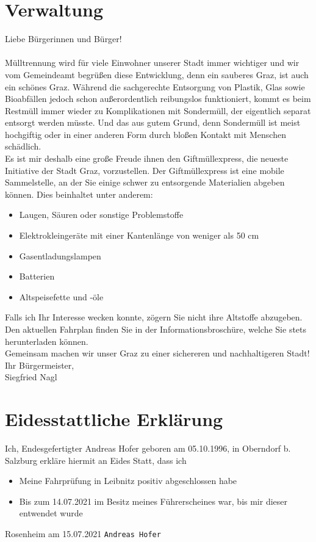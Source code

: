 \documentclass{article}
\begin{document}
	\section*{Verwaltung}
	Liebe Bürgerinnen und Bürger! \\ \\
	Mülltrennung wird für viele Einwohner unserer Stadt immer wichtiger und wir vom Gemeindeamt begrüßen diese Entwicklung, denn ein sauberes Graz, ist auch ein schönes Graz. Während die sachgerechte Entsorgung von Plastik, Glas sowie Bioabfällen jedoch schon außerordentlich reibungslos funktioniert, kommt es beim Restmüll immer wieder zu Komplikationen mit Sondermüll, der eigentlich separat entsorgt werden müsste. Und das aus gutem Grund, denn Sondermüll ist meist hochgiftig oder in einer anderen Form durch bloßen Kontakt mit Menschen schädlich. \\
	Es ist mir deshalb eine große Freude ihnen den Giftmüllexpress, die neueste Initiative der Stadt Graz, vorzustellen. Der Giftmüllexpress ist eine mobile Sammelstelle, an der Sie einige schwer zu entsorgende Materialien abgeben können. Dies beinhaltet unter anderem:
	\begin{itemize}
		\item{Laugen, Säuren oder sonstige Problemstoffe}
		\item{Elektrokleingeräte mit einer Kantenlänge von weniger als 50 cm}
		\item{Gasentladungslampen}
		\item{Batterien}
		\item{Altspeisefette und -öle}
	\end{itemize}
	Falls ich Ihr Interesse wecken konnte, zögern Sie nicht ihre Altstoffe abzugeben. Den aktuellen Fahrplan finden Sie in der Informationsbroschüre, welche Sie stets \href{https://www.umweltservice.graz.at/infos/abfall/Giftmuellexpress.pdf}{} herunterladen können. \\

	Gemeinsam machen wir unser Graz zu einer sichereren und nachhaltigeren Stadt! \\

	Ihr Bürgermeister, \\

	Siegfried Nagl
	\newpage

	\section*{Eidesstattliche Erklärung}
	Ich, Endesgefertigter Andreas Hofer geboren am 05.10.1996, in Oberndorf b. Salzburg erkläre hiermit an Eides Statt, dass ich
	\begin{itemize}
		\item{Meine Fahrprüfung in Leibnitz positiv abgeschlossen habe}
		\item{Bis zum 14.07.2021 im Besitz meines Führerscheines war, bis mir dieser entwendet wurde}
	\end{itemize}
	\vspace{10pt}
	Rosenheim am 15.07.2021 \hspace{8.5cm} \texttt{\small{Andreas Hofer}} \\
	\newpage
\end{document}
